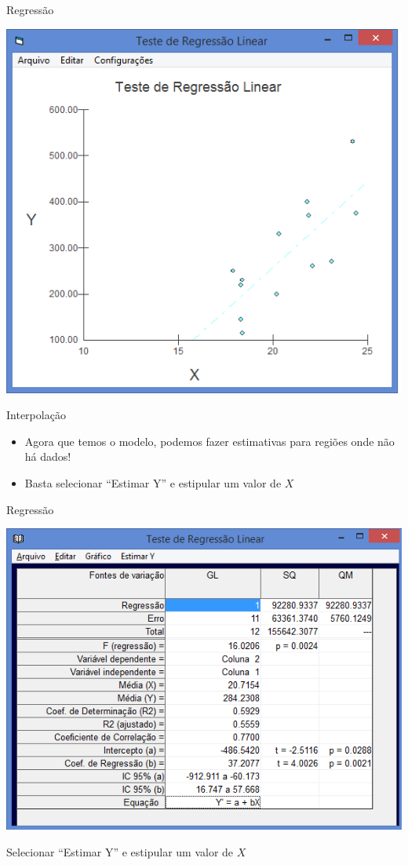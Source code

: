 \documentclass{beamer}
\begin{document}
\begin{frame}{Regressão}
  \begin{center}
    \includegraphics[height=0.9\textheight]{Pratica_Assoc/grafico_regressao}
  \end{center}
\end{frame}

\begin{frame}{Interpolação}
  \begin{itemize}
  \item Agora que temos o modelo, podemos fazer estimativas
    para regiões onde não há dados!
  \item Basta selecionar ``Estimar Y'' e estipular um valor de $X$
  \end{itemize}
\end{frame}

\begin{frame}{Regressão}
  \begin{center}
    \includegraphics[height=0.7\textheight]{Pratica_Assoc/resultado_regressao}
  \end{center}

Selecionar ``Estimar Y'' e estipular um valor de $X$
\end{frame}
\end{document}
